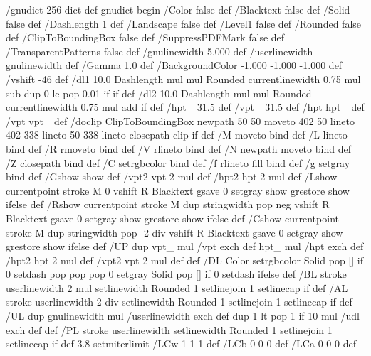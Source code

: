 /gnudict 256 dict def
gnudict begin
%
%
/Color false def
/Blacktext false def
/Solid false def
/Dashlength 1 def
/Landscape false def
/Level1 false def
/Rounded false def
/ClipToBoundingBox false def
/SuppressPDFMark false def
/TransparentPatterns false def
/gnulinewidth 5.000 def
/userlinewidth gnulinewidth def
/Gamma 1.0 def
/BackgroundColor {-1.000 -1.000 -1.000} def
%
/vshift -46 def
/dl1 {
  10.0 Dashlength mul mul
  Rounded { currentlinewidth 0.75 mul sub dup 0 le { pop 0.01 } if } if
} def
/dl2 {
  10.0 Dashlength mul mul
  Rounded { currentlinewidth 0.75 mul add } if
} def
/hpt_ 31.5 def
/vpt_ 31.5 def
/hpt hpt_ def
/vpt vpt_ def
/doclip {
  ClipToBoundingBox {
    newpath 50 50 moveto 402 50 lineto 402 338 lineto 50 338 lineto closepath
    clip
  } if
} def
%
%
%
/M {moveto} bind def
/L {lineto} bind def
/R {rmoveto} bind def
/V {rlineto} bind def
/N {newpath moveto} bind def
/Z {closepath} bind def
/C {setrgbcolor} bind def
/f {rlineto fill} bind def
/g {setgray} bind def
/Gshow {show} def   %
/vpt2 vpt 2 mul def
/hpt2 hpt 2 mul def
/Lshow {currentpoint stroke M 0 vshift R 
	Blacktext {gsave 0 setgray show grestore} {show} ifelse} def
/Rshow {currentpoint stroke M dup stringwidth pop neg vshift R
	Blacktext {gsave 0 setgray show grestore} {show} ifelse} def
/Cshow {currentpoint stroke M dup stringwidth pop -2 div vshift R 
	Blacktext {gsave 0 setgray show grestore} {show} ifelse} def
/UP {dup vpt_ mul /vpt exch def hpt_ mul /hpt exch def
  /hpt2 hpt 2 mul def /vpt2 vpt 2 mul def} def
/DL {Color {setrgbcolor Solid {pop []} if 0 setdash}
 {pop pop pop 0 setgray Solid {pop []} if 0 setdash} ifelse} def
/BL {stroke userlinewidth 2 mul setlinewidth
	Rounded {1 setlinejoin 1 setlinecap} if} def
/AL {stroke userlinewidth 2 div setlinewidth
	Rounded {1 setlinejoin 1 setlinecap} if} def
/UL {dup gnulinewidth mul /userlinewidth exch def
	dup 1 lt {pop 1} if 10 mul /udl exch def} def
/PL {stroke userlinewidth setlinewidth
	Rounded {1 setlinejoin 1 setlinecap} if} def
3.8 setmiterlimit
/LCw {1 1 1} def
/LCb {0 0 0} def
/LCa {0 0 0} def
